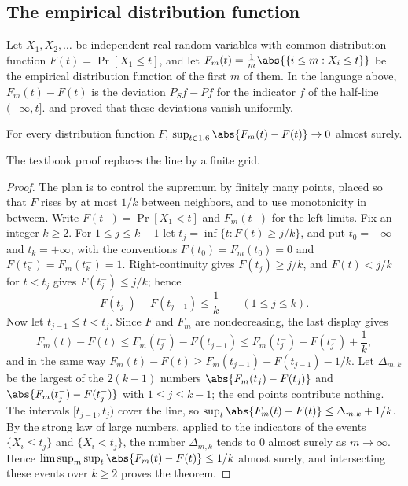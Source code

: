 \begin{refsection}
\subsection{The empirical distribution function}\label{sec:vc:gc}

Let $X_1,X_2,\dots$ be independent real random variables with common distribution function $F(t) = \Pr[X_1\le t]$, and let $F_m(t) = \frac1m\abs{\{i\le m: X_i\le t\}}$ be the empirical distribution function of the first $m$ of them. In the language above, $F_m(t)-F(t)$ is the deviation $P_Sf-Pf$ for the indicator $f$ of the half-line $(-\infty,t]$. \textcite{Glivenko1933} and \textcite{Cantelli1933} proved that these deviations vanish uniformly.

\begin{theorem}\label{thm:vc:gc}
For every distribution function $F$, $\sup_{t\in\R}\abs{F_m(t)-F(t)}\to0$ almost surely.
\end{theorem}

The textbook proof replaces the line by a finite grid.

\begin{proof}
The plan is to control the supremum by finitely many points, placed so that $F$ rises by at most $1/k$ between neighbors, and to use monotonicity in between. Write $F(t^-) = \Pr[X_1<t]$ and $F_m(t^-)$ for the left limits. Fix an integer $k\ge2$. For $1\le j\le k-1$ let $t_j = \inf\{t: F(t)\ge j/k\}$, and put $t_0 = -\infty$ and $t_k = +\infty$, with the conventions $F(t_0) = F_m(t_0) = 0$ and $F(t_k^-) = F_m(t_k^-) = 1$. Right-continuity gives $F(t_j)\ge j/k$, and $F(t)<j/k$ for $t<t_j$ gives $F(t_j^-)\le j/k$; hence
\[
  F(t_j^-)-F(t_{j-1})\le\frac1k \qquad (1\le j\le k).
\]
Now let $t_{j-1}\le t<t_j$. Since $F$ and $F_m$ are nondecreasing, the last display gives
\[
  F_m(t)-F(t)\le F_m(t_j^-)-F(t_{j-1})\le F_m(t_j^-)-F(t_j^-)+\frac1k ,
\]
and in the same way $F_m(t)-F(t)\ge F_m(t_{j-1})-F(t_{j-1})-1/k$. Let $\Delta_{m,k}$ be the largest of the $2(k-1)$ numbers $\abs{F_m(t_j)-F(t_j)}$ and $\abs{F_m(t_j^-)-F(t_j^-)}$ with $1\le j\le k-1$; the end points contribute nothing. The intervals $[t_{j-1},t_j)$ cover the line, so $\sup_t\abs{F_m(t)-F(t)}\le\Delta_{m,k}+1/k$. By the strong law of large numbers, applied to the indicators of the events $\{X_i\le t_j\}$ and $\{X_i<t_j\}$, the number $\Delta_{m,k}$ tends to $0$ almost surely as $m\to\infty$. Hence $\limsup_m\sup_t\abs{F_m(t)-F(t)}\le1/k$ almost surely, and intersecting these events over $k\ge2$ proves the theorem.
\end{proof}


\end{refsection}
